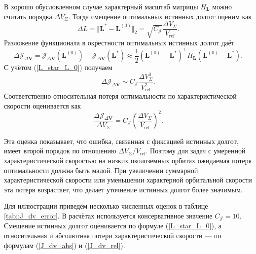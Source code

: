 В хорошо обусловленном случае характерный масштаб матрицы $H_{\mathbf{L}}$ можно считать порядка $\Delta V_{\Sigma}$. Тогда смещение оптимальных истинных долгот оценим как
\begin{equation}
    \Delta L = \Vert \mathbf{L}^* - \mathbf{L}^{(0)} \Vert_2 = 
    \sqrt{C_\mathcal{J}} \frac{\Delta V_{\Sigma}}{V_{\text{ref}}} .
\label{L_star_L_0}
\end{equation}
Разложение функционала в окрестности оптимальных истинных долгот даёт 
\begin{equation}
     \Delta \mathcal{J}_{\Delta \mathbf{V}} = 
    \mathcal{J}_{\Delta \mathbf{V}} (\mathbf{L}^{(0)}) - 
    \mathcal{J}_{\Delta \mathbf{V}} (\mathbf{L}^*) \approx
    \frac{1}{2} \left( \mathbf{L}^{(0)} - \mathbf{L}^* \right)^\top H_{\mathbf{L}}
    \left( \mathbf{L}^{(0)} - \mathbf{L}^* \right).
\end{equation}
С учётом (\ref{L_star_L_0}) получаем
\begin{equation}
    \Delta \mathcal{J}_{\Delta \mathbf{V}} \sim 
    C_\mathcal{J} \frac{\Delta V_{\Sigma}^3}{V_{\text{ref}}^2} .
\label{J_dv_abs}
\end{equation}
Соответственно относительная потеря оптимальности по характеристической скорости оценивается как
\begin{equation}
    \frac{\Delta \mathcal{J}_{\Delta \mathbf{V}}}{\Delta V_{\Sigma}} = 
    C_\mathcal{J} \left( \frac{\Delta V_{\Sigma}}{V_{\text{ref}}} \right)^2.
\label{J_dv_rel}
\end{equation}

Эта оценка показывает, что ошибка, связанная с фиксацией истинных долгот, имеет второй порядок по отношению $\Delta V_{\Sigma} / V_{\text{ref}}$. Поэтому для задач с умеренной характеристической скоростью на низких околоземных орбитах ожидаемая потеря оптимальности должна быть малой. При увеличении суммарной характеристической скорости или уменьшении характерной орбитальной скорости эта потеря возрастает, что делает уточнение истинных долгот более значимым.

Для иллюстрации приведём несколько численных оценок в таблице \ref{tab::J_dv_error}. В расчётах используется консервативное значение $C_\mathcal{J} = 10$. Смещение истинных долгот оценивается по формуле (\ref{L_star_L_0}), а относительная и абсолютная потери характеристической скорости --- по формулам (\ref{J_dv_abs}) и (\ref{J_dv_rel}).


